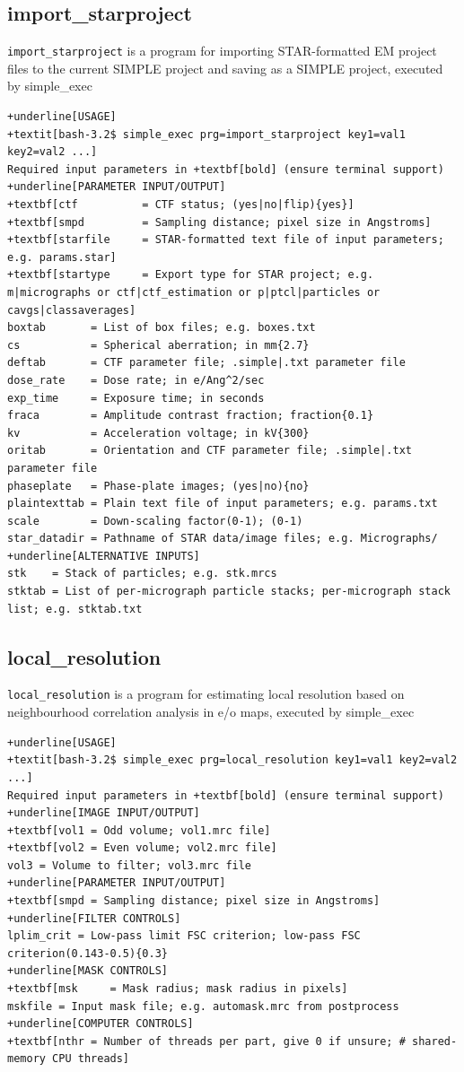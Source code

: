 \documentclass[a4paper,11pt]{article}
\newcommand{\prgname}[1]{\textcolor{NavyBlue}{\texttt{#1}}}
\begin{document}
\subsection{import\_starproject}
\label{import_starproject}
\prgname{import\_starproject} is a program for importing STAR-formatted EM project files to the current SIMPLE project and saving as a SIMPLE project, executed by simple\_exec
\begin{Verbatim}[commandchars=+\[\],fontsize=\small,breaklines=true]
+underline[USAGE]
+textit[bash-3.2$ simple_exec prg=import_starproject key1=val1 key2=val2 ...]
Required input parameters in +textbf[bold] (ensure terminal support)
+underline[PARAMETER INPUT/OUTPUT]
+textbf[ctf          = CTF status; (yes|no|flip){yes}]
+textbf[smpd         = Sampling distance; pixel size in Angstroms]
+textbf[starfile     = STAR-formatted text file of input parameters; e.g. params.star]
+textbf[startype     = Export type for STAR project; e.g. m|micrographs or ctf|ctf_estimation or p|ptcl|particles or cavgs|classaverages]
boxtab       = List of box files; e.g. boxes.txt
cs           = Spherical aberration; in mm{2.7}
deftab       = CTF parameter file; .simple|.txt parameter file
dose_rate    = Dose rate; in e/Ang^2/sec
exp_time     = Exposure time; in seconds
fraca        = Amplitude contrast fraction; fraction{0.1}
kv           = Acceleration voltage; in kV{300}
oritab       = Orientation and CTF parameter file; .simple|.txt parameter file
phaseplate   = Phase-plate images; (yes|no){no}
plaintexttab = Plain text file of input parameters; e.g. params.txt
scale        = Down-scaling factor(0-1); (0-1)
star_datadir = Pathname of STAR data/image files; e.g. Micrographs/
+underline[ALTERNATIVE INPUTS]
stk    = Stack of particles; e.g. stk.mrcs
stktab = List of per-micrograph particle stacks; per-micrograph stack list; e.g. stktab.txt
\end{Verbatim}

\subsection{local\_resolution}
\label{local_resolution}
\prgname{local\_resolution} is a program for estimating local resolution based on neighbourhood correlation analysis in e/o maps, executed by simple\_exec
\begin{Verbatim}[commandchars=+\[\],fontsize=\small,breaklines=true]
+underline[USAGE]
+textit[bash-3.2$ simple_exec prg=local_resolution key1=val1 key2=val2 ...]
Required input parameters in +textbf[bold] (ensure terminal support)
+underline[IMAGE INPUT/OUTPUT]
+textbf[vol1 = Odd volume; vol1.mrc file]
+textbf[vol2 = Even volume; vol2.mrc file]
vol3 = Volume to filter; vol3.mrc file
+underline[PARAMETER INPUT/OUTPUT]
+textbf[smpd = Sampling distance; pixel size in Angstroms]
+underline[FILTER CONTROLS]
lplim_crit = Low-pass limit FSC criterion; low-pass FSC criterion(0.143-0.5){0.3}
+underline[MASK CONTROLS]
+textbf[msk     = Mask radius; mask radius in pixels]
mskfile = Input mask file; e.g. automask.mrc from postprocess
+underline[COMPUTER CONTROLS]
+textbf[nthr = Number of threads per part, give 0 if unsure; # shared-memory CPU threads]
\end{Verbatim}
\end{document}

